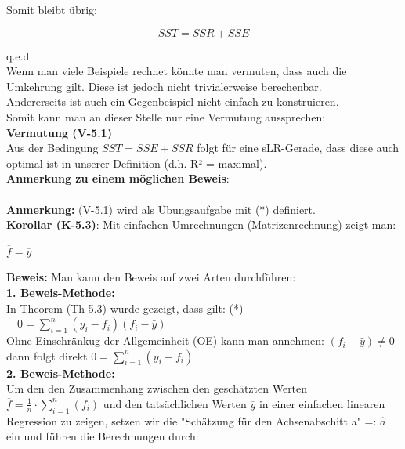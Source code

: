 \documentclass[12pt]{article}
\begin{document}
Somit bleibt übrig:

\[
SST = SSR + SSE
\]

q.e.d \\[0.7cm]
%
Wenn man viele Beispiele rechnet könnte man vermuten, dass auch die Umkehrung gilt. Diese ist jedoch nicht trivialerweise berechenbar.\\ Andererseits ist auch ein Gegenbeispiel nicht einfach zu konstruieren.\\  Somit kann man an dieser Stelle nur eine Vermutung aussprechen: \\[0.2cm]
%
% 
\textbf{Vermutung (V-5.1)}\\[0.2cm]
Aus der Bedingung $ SST = SSE + SSR $ folgt für eine sLR-Gerade, dass diese auch optimal ist in unserer Definition (d.h. R² = maximal).\\[0.2cm] 
%
\textbf{Anmerkung zu einem möglichen Beweis}:\\ 
%
{\color{red}{Kann zur Zeit noch nicht bewiesen werden.\\
Auch ein Gegenbeispiel ist nicht trivial konstruierbar.\\
Somit bleibt diese Frage offen, bis ein Beweis gefunden ist.}}\\[0.3
cm]
%
\textbf{Anmerkung:} (V-5.1) wird als Übungsaufgabe mit (*) definiert.\\[0.4cm]
\textbf{Korollar (K-5.3)}: 
Mit einfachen Umrechnungen (Matrizenrechnung) zeigt man: 
\begin{large}
\begin{center}
$ \overline{f} = \overline{y} $ \\
\end{center} 
\end{large}
%
\textbf{Beweis:} Man kann den Beweis auf zwei Arten durchführen:\\
\textbf{1. Beweis-Methode:}\\
In Theorem (Th-5.3) wurde gezeigt, dass gilt: (*) $ \quad 0 = \sum_{i=1}^{n} (y_i - f_i)(f_i - \bar{y})$ \\
Ohne Einschränkug der Allgemeinheit (OE) kann man annehmen: $(f_i - \bar{y}) \neq 0 $ \\ dann folgt direkt $0 = \sum_{i=1}^{n} (y_i - f_i)$ \\
\textbf{2. Beweis-Methode:}\\
Um den den Zusammenhang zwischen den geschätzten Werten $ \overline{f} = \frac{1}{n} \cdot \sum_{i=1}^{n} (f_i)$ und den tatsächlichen Werten $ \overline{y} $ in einer einfachen linearen Regression zu zeigen, setzen wir die "Schätzung für den Achsenabschitt a"  =: $ \hat{a} $ ein und führen die Berechnungen durch:
\end{document}
